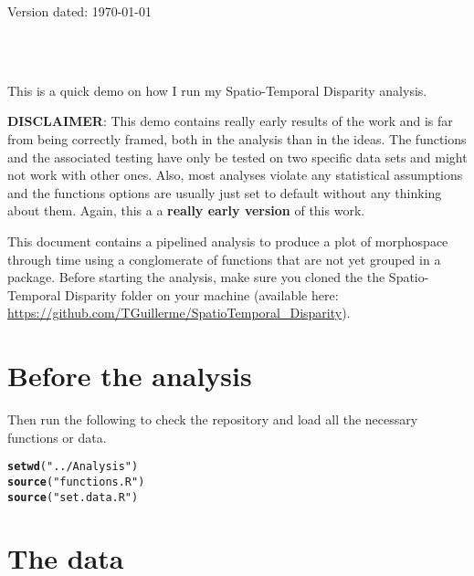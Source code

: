 \documentclass[a4paper,11pt]{article}\usepackage[]{graphicx}\usepackage[]{color}
\makeatletter
\newcommand{\hlstr}[1]{\textcolor[rgb]{0.192,0.494,0.8}{#1}}%
\newcommand{\hlstd}[1]{\textcolor[rgb]{0.345,0.345,0.345}{#1}}%
\newcommand{\hlkwd}[1]{\textcolor[rgb]{0.737,0.353,0.396}{\textbf{#1}}}%
\newenvironment{kframe}{%
 \def\at@end@of@kframe{}%
 \ifinner\ifhmode%
  \def\at@end@of@kframe{\end{minipage}}%
  \begin{minipage}{\columnwidth}%
 \fi\fi%
 \def\FrameCommand##1{\hskip\@totalleftmargin \hskip-\fboxsep
 \colorbox{shadecolor}{##1}\hskip-\fboxsep
     \hskip-\linewidth \hskip-\@totalleftmargin \hskip\columnwidth}%
 \MakeFramed {\advance\hsize-\width
   \@totalleftmargin\z@ \linewidth\hsize
   \@setminipage}}%
 {\par\unskip\endMakeFramed%
 \at@end@of@kframe}
\newenvironment{knitrout}{}{} %
\makeatother
\begin{document}
\begin{flushright}
Version dated: \today
\end{flushright}
\begin{center}

\\
\bigskip
\\

\end{center}
This is a quick demo on how I run my Spatio-Temporal Disparity analysis.

\textbf{DISCLAIMER}:
This demo contains really early results of the work and is far from being correctly framed, both in the analysis than in the ideas.
The functions and the associated testing have only be tested on two specific data sets and might not work with other ones.
Also, most analyses violate any statistical assumptions and the functions options are usually just set to default without any thinking about them.
Again, this a a \textbf{really early version} of this work.

This document contains a pipelined analysis to produce a plot of morphospace through time using a conglomerate of functions that are not yet grouped in a package.
Before starting the analysis, make sure you cloned the the Spatio-Temporal Disparity folder on your machine (available here: \url{https://github.com/TGuillerme/SpatioTemporal_Disparity}).

\section{Before the analysis}
Then run the following to check the repository and load all the necessary functions or data.

\begin{knitrout}
\color{fgcolor}\begin{kframe}
\begin{alltt}
\hlkwd{setwd}\hlstd{(}\hlstr{"../Analysis"}\hlstd{)}
\hlkwd{source}\hlstd{(}\hlstr{"functions.R"}\hlstd{)}
\hlkwd{source}\hlstd{(}\hlstr{"set.data.R"}\hlstd{)}
\end{alltt}
\end{kframe}
\end{knitrout}

\section{The data} \label{data}
\end{document}
